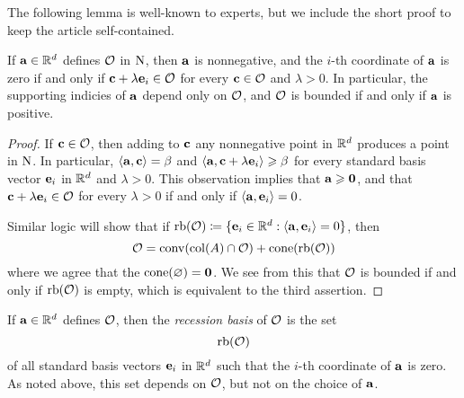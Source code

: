 \documentclass[11pt]{amsart}
\begin{document}
The following lemma is well-known to experts, but we include the short proof to keep the article self-contained.

\begin{lemma} 
\label{face: L}
If $\mathbf{a} \in \mathbb{R}^d$ defines $\mathcal{O}$ in $\mathrm{N}$, then $\mathbf{a}$ is nonnegative, and the $i$-th coordinate of $\mathbf{a}$ is zero if and only if $\mathbf{c} + \lambda \mathbf{e}_i \in \mathcal{O}$  for every $\mathbf{c} \in \mathcal{O}$ and $\lambda > 0$.  In particular, the supporting indicies of $\mathbf{a}$ depend only on $\mathcal{O}$, and $\mathcal{O}$ is bounded if and only if $\mathbf{a}$ is positive. 
\end{lemma}

\begin{proof}  If $\mathbf{c} \in \mathcal{O}$, then adding to $\mathbf{c}$ any nonnegative point in $\mathbb{R}^d$ produces a point in $\mathrm{N}$.  In particular, $\langle \mathbf{a}, \mathbf{c} \rangle = \beta$ and $\langle \mathbf{a}, \mathbf{c} + \lambda \mathbf{e}_i \rangle \geqslant \beta$ for every standard basis vector $\mathbf{e}_i$ in $\mathbb{R}^d$ and $\lambda > 0$.  This observation implies that $\mathbf{a} \geqslant \mathbf{0}$, and that $\mathbf{c} + \lambda \mathbf{e}_i \in \mathcal{O}$ for every $\lambda > 0$ if and only if $\langle \mathbf{a}, \mathbf{e}_i \rangle = 0$.  

Similar logic will show that if $\operatorname{rb}(\mathcal{O}) \coloneqq  \{ \mathbf{e}_i \in \mathbb{R}^d : \langle \mathbf{a}, \mathbf{e}_i \rangle = 0\}$, then 
\begin{equation}
\label{face: e}
\mathcal{O} =  \operatorname{conv}( \operatorname{col}(A) \cap \mathcal{O} ) + \operatorname{cone}(\operatorname{rb}(\mathcal{O}))
\end{equation}
where we agree that the $\operatorname{cone}(\varnothing) = \mathbf{0}$.  We see from this that $\mathcal{O}$ is bounded if and only if $\operatorname{rb}(\mathcal{O})$ is empty, which is equivalent to the third assertion.  
\end{proof}

\begin{definition} If $\mathbf{a} \in \mathbb{R}^d$ defines $\mathcal{O}$, then the \emph{recession basis} of $\mathcal{O}$ is the set \[ \operatorname{rb}(\mathcal{O}) \] of all standard basis vectors $\mathbf{e}_i$ in $\mathbb{R}^d$ such that the $i$-th coordinate of $\mathbf{a}$ is zero.  As noted above, this set depends on $\mathcal{O}$, but not on the choice of $\mathbf{a}$.
\end{definition}

\end{document}
